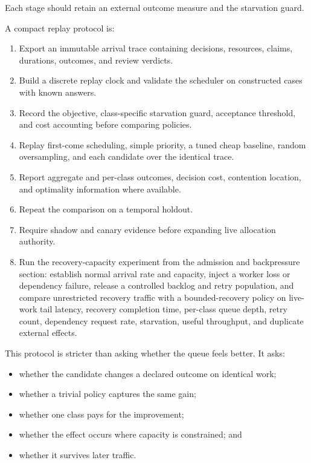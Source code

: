 Each stage should retain an external outcome measure and the starvation guard.


A compact replay protocol is:

\begin{enumerate}
\def\labelenumi{\arabic{enumi}.}
\tightlist
\item
  Export an immutable arrival trace containing decisions, resources, claims, durations, outcomes, and review verdicts.
\item
  Build a discrete replay clock and validate the scheduler on constructed cases with known answers.
\item
  Record the objective, class-specific starvation guard, acceptance threshold, and cost accounting before comparing policies.
\item
  Replay first-come scheduling, simple priority, a tuned cheap baseline, random oversampling, and each candidate over the identical trace.
\item
  Report aggregate and per-class outcomes, decision cost, contention location, and optimality information where available.
\item
  Repeat the comparison on a temporal holdout.
\item
  Require shadow and canary evidence before expanding live allocation authority.
\item
  Run the recovery-capacity experiment from the admission and backpressure section: establish normal arrival rate and capacity, inject a worker loss or dependency failure, release a controlled backlog and retry population, and compare unrestricted recovery traffic with a bounded-recovery policy on live-work tail latency, recovery completion time, per-class queue depth, retry count, dependency request rate, starvation, useful throughput, and duplicate external effects.
\end{enumerate}


This protocol is stricter than asking whether the queue feels better. It asks:

\begin{itemize}
\tightlist
\item
  whether the candidate changes a declared outcome on identical work;
\item
  whether a trivial policy captures the same gain;
\item
  whether one class pays for the improvement;
\item
  whether the effect occurs where capacity is constrained; and
\item
  whether it survives later traffic.
\end{itemize}

